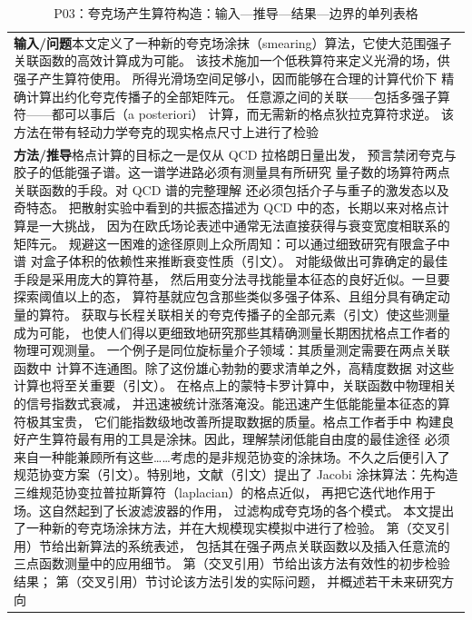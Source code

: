 \documentclass[UTF8,11pt,oneside]{ctexbook}
\begin{document}
\begin{table}[htbp]
  \centering
  \caption*{P03：夸克场产生算符构造：输入—推导—结果—边界的单列表格}
  \small
  \begin{tabular}{@{}p{}@{}}
    \toprule
    \textbf{输入/问题}\quad 本文定义了一种新的夸克场涂抹（smearing）算法，它使大范围强子关联函数的高效计算成为可能。 该技术施加一个低秩算符来定义光滑的场，供强子产生算符使用。 所得光滑场空间足够小，因而能够在合理的计算代价下 精确计算出约化夸克传播子的全部矩阵元。 任意源之间的关联——包括多强子算符——都可以事后（a posteriori） 计算，而无需新的格点狄拉克算符求逆。 该方法在带有轻动力学夸克的现实格点尺寸上进行了检验 \\
    \textbf{方法/推导}\quad 格点计算的目标之一是仅从 QCD 拉格朗日量出发， 预言禁闭夸克与胶子的低能强子谱。这一谱学进路必须有测量具有所研究 量子数的场算符两点关联函数的手段。对 QCD 谱的完整理解 还必须包括介子与重子的激发态以及奇特态。 把散射实验中看到的共振态描述为 QCD 中的态，长期以来对格点计算是一大挑战， 因为在欧氏场论表述中通常无法直接获得与衰变宽度相联系的矩阵元。 规避这一困难的途径原则上众所周知：可以通过细致研究有限盒子中谱 对盒子体积的依赖性来推断衰变性质（引文）。 对能级做出可靠确定的最佳手段是采用庞大的算符基， 然后用变分法寻找能量本征态的良好近似。一旦要探索阈值以上的态， 算符基就应包含那些类似多强子体系、且组分具有确定动量的算符。 获取与长程关联相关的夸克传播子的全部元素（引文）使这些测量成为可能， 也使人们得以更细致地研究那些其精确测量长期困扰格点工作者的物理可观测量。 一个例子是同位旋标量介子领域：其质量测定需要在两点关联函数中 计算不连通图。除了这份雄心勃勃的要求清单之外，高精度数据 对这些计算也将至关重要（引文）。 在格点上的蒙特卡罗计算中，关联函数中物理相关的信号指数式衰减， 并迅速被统计涨落淹没。能迅速产生低能能量本征态的算符极其宝贵， 它们能指数级地改善所提取数据的质量。格点工作者手中 构建良好产生算符最有用的工具是涂抹。因此，理解禁闭低能自由度的最佳途径 必须来自一种能兼顾所有这些……考虑的是非规范协变的涂抹场。不久之后便引入了 规范协变方案（引文）。特别地，文献（引文）提出了 Jacobi 涂抹算法：先构造三维规范协变拉普拉斯算符（laplacian）的格点近似， 再把它迭代地作用于场。这自然起到了长波滤波器的作用， 过滤构成夸克场的各个模式。 本文提出了一种新的夸克场涂抹方法，并在大规模现实模拟中进行了检验。 第（交叉引用）节给出新算法的系统表述， 包括其在强子两点关联函数以及插入任意流的三点函数测量中的应用细节。 第（交叉引用）节给出该方法有效性的初步检验结果； 第（交叉引用）节讨论该方法引发的实际问题， 并概述若干未来研究方向 \\

\end{tabular}
\end{table}
\end{document}
